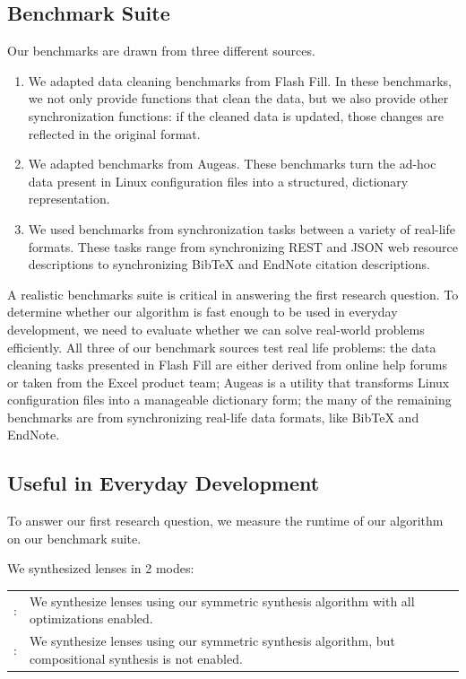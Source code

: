 \documentclass[acmsmall,screen,anonymous]{acmart}
\begin{document}
\subsection{Benchmark Suite}
Our benchmarks are drawn from three different sources.
\begin{enumerate}
\item We adapted  data cleaning benchmarks from Flash Fill. In these
  benchmarks, we not only provide functions that clean the data, but we also
  provide other synchronization functions: if the cleaned data is updated, those
  changes are reflected in the original format.
\item We adapted  benchmarks from Augeas. These benchmarks turn the
  ad-hoc data present in Linux configuration files into a structured, dictionary
  representation. 
\item We used  benchmarks from synchronization tasks between a
  variety of real-life formats. These tasks range from synchronizing REST
  and JSON web resource descriptions to synchronizing BibTeX and EndNote
  citation descriptions.
\end{enumerate}

A realistic benchmarks suite is critical in answering the first research
question. To determine whether our algorithm is fast enough to be used in
everyday development, we need to evaluate whether we can solve real-world
problems efficiently. All three of our benchmark sources test real life
problems: the data cleaning tasks presented in Flash Fill are either derived
from online help forums or taken from the Excel product team; Augeas is a
utility that transforms Linux configuration files into a manageable dictionary
form; the many of the remaining benchmarks are from synchronizing real-life data
formats, like BibTeX and EndNote.

\subsection{Useful in Everyday Development}

To answer our first research question, we measure the runtime of our algorithm
on our benchmark suite.

We synthesized lenses in 2 modes:

\begin{tabulary}{\linewidth}{rL}
  \SSOpt{}: & We synthesize lenses using our symmetric synthesis algorithm with all optimizations enabled.\\
  \SSNCOpt{}: & We synthesize lenses using our symmetric synthesis algorithm,
                but compositional synthesis is not enabled.\\
\end{tabulary}\\
\end{document}

